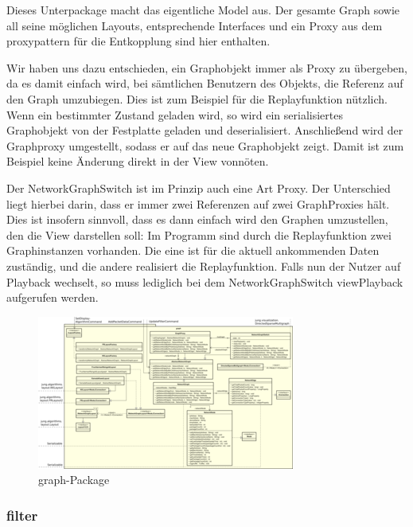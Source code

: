     Dieses Unterpackage macht das eigentliche Model aus. Der gesamte Graph sowie
    all seine möglichen Layouts, entsprechende Interfaces und ein Proxy aus dem
    \gls{proxypattern} für die Entkopplung sind hier enthalten.\par
    Wir haben uns dazu entschieden, ein Graphobjekt immer als Proxy zu übergeben, da es damit einfach wird,
    bei sämtlichen Benutzern des Objekts, die Referenz auf den Graph umzubiegen. Dies ist zum Beispiel
    für die Replayfunktion nützlich. Wenn ein bestimmter Zustand geladen wird, so wird ein serialisiertes
    Graphobjekt von der Festplatte geladen und deserialisiert. Anschließend wird der Graphproxy
    umgestellt, sodass er auf das neue Graphobjekt zeigt. Damit ist zum Beispiel keine Änderung direkt in der View vonnöten.\par
    Der NetworkGraphSwitch ist im Prinzip auch eine Art Proxy. Der Unterschied liegt hierbei darin, dass
    er immer zwei Referenzen auf zwei GraphProxies hält. Dies ist insofern sinnvoll, dass es dann einfach wird
    den Graphen umzustellen, den die View darstellen soll: Im Programm sind durch die Replayfunktion zwei
    Graphinstanzen vorhanden. Die eine ist für die aktuell ankommenden Daten zuständig, und die andere realisiert
    die Replayfunktion. Falls nun der Nutzer auf Playback wechselt, so muss lediglich bei dem NetworkGraphSwitch
    viewPlayback aufgerufen werden.

    \clearpage
    \begin{figure}
      \centering
      \includegraphics[width=\textwidth]{../diagramimages/graph.png}
      \caption{graph-Package}
    \end{figure}
    \clearpage

    \subsubsection{filter}
    \label{subsubsec:filter}

